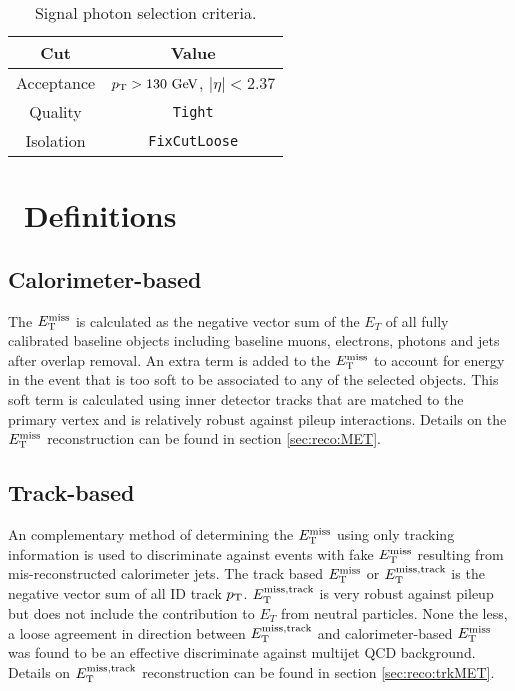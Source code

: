 \begin{table}[htp]
  \caption{Signal photon selection criteria.} 
  \begin{center}
    \begin{tabular}{c|c} \hline \hline
      Cut & Value \\ \hline \hline
      Acceptance & $\pT > 130 \gev$, $|\eta| < 2.37$ \\ \hline
      Quality & {\tt Tight} \\ \hline
      Isolation &  {\tt FixCutLoose} \\ \hline
      \hline
    \end{tabular}
  \end{center}
  \label{tb:photons}
\end{table}%

\section{\met\ Definitions} 
\label{sec:Selection_MET}

\subsection{\boldmath Calorimeter-based \met}

\indent The $E_{\mathrm{T}}^{\mathrm{miss}}$ is calculated as the negative vector sum of the $E_T$ of all fully calibrated baseline objects including baseline muons, electrons, photons and jets after overlap removal.   An extra term is added to the $E_{\mathrm{T}}^{\mathrm{miss}}$ to account for energy in the event that is too soft to be associated to any of the selected objects. This soft term is calculated using inner detector tracks that are matched to the primary vertex and is relatively robust against pileup interactions.  Details on the $E_{\mathrm{T}}^{\mathrm{miss}}$ reconstruction can be found in section \ref{sec:reco:MET}. \\ 

\subsection{\boldmath Track-based \MET}

\indent An complementary method of determining the $E_{\mathrm{T}}^{\mathrm{miss}}$ using only tracking information is used to discriminate against events with fake $E_{\mathrm{T}}^{\mathrm{miss}}$ resulting from mis-reconstructed calorimeter jets.  The track based $E_{\mathrm{T}}^{\mathrm{miss}}$ or $E_{\mathrm{T}}^{\mathrm{miss, track}}$ is the negative vector sum of all ID track $p_{\mathrm{T}}$.  $E_{\mathrm{T}}^{\mathrm{miss, track}}$ is very robust against pileup but does not include the contribution to $E_T$ from neutral particles.  None the less, a loose agreement in direction between $E_{\mathrm{T}}^{\mathrm{miss, track}}$ and calorimeter-based $E_{\mathrm{T}}^{\mathrm{miss}}$ was found to be an effective discriminate against multijet QCD background.  Details on $E_{\mathrm{T}}^{\mathrm{miss, track}}$ reconstruction can be found in section \ref{sec:reco:trkMET}. \\

